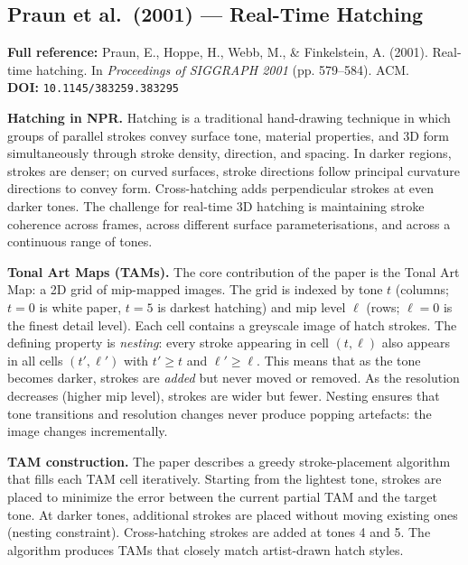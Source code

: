 \documentclass[11pt, a4paper]{article}
\begin{document}
\vspace{8pt}
\subsection{Praun et al.\ (2001) --- Real-Time Hatching}

\begin{refbox}
\textbf{Full reference:} Praun, E., Hoppe, H., Webb, M., \& Finkelstein, A. (2001). Real-time hatching. In \textit{Proceedings of SIGGRAPH 2001} (pp. 579--584). ACM.\\[4pt]
\textbf{DOI:} \texttt{10.1145/383259.383295}
\end{refbox}

\textbf{Hatching in NPR.} Hatching is a traditional hand-drawing technique in which groups of parallel strokes convey surface tone, material properties, and 3D form simultaneously through stroke density, direction, and spacing. In darker regions, strokes are denser; on curved surfaces, stroke directions follow principal curvature directions to convey form. Cross-hatching adds perpendicular strokes at even darker tones. The challenge for real-time 3D hatching is maintaining stroke coherence across frames, across different surface parameterisations, and across a continuous range of tones.

\textbf{Tonal Art Maps (TAMs).} The core contribution of the paper is the Tonal Art Map: a 2D grid of mip-mapped images. The grid is indexed by tone $t$ (columns; $t = 0$ is white paper, $t = 5$ is darkest hatching) and mip level $\ell$ (rows; $\ell = 0$ is the finest detail level). Each cell contains a greyscale image of hatch strokes. The defining property is \textit{nesting}: every stroke appearing in cell $(t, \ell)$ also appears in all cells $(t', \ell')$ with $t' \geq t$ and $\ell' \geq \ell$. This means that as the tone becomes darker, strokes are \textit{added} but never moved or removed. As the resolution decreases (higher mip level), strokes are wider but fewer. Nesting ensures that tone transitions and resolution changes never produce popping artefacts: the image changes incrementally.

\textbf{TAM construction.} The paper describes a greedy stroke-placement algorithm that fills each TAM cell iteratively. Starting from the lightest tone, strokes are placed to minimize the error between the current partial TAM and the target tone. At darker tones, additional strokes are placed without moving existing ones (nesting constraint). Cross-hatching strokes are added at tones 4 and 5. The algorithm produces TAMs that closely match artist-drawn hatch styles.
\end{document}
